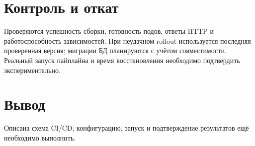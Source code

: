 \documentclass[14pt,a4paper]{extarticle}
\begin{document}
\section{Контроль и откат}
Проверяются успешность сборки, готовность подов, ответы HTTP и работоспособность зависимостей. При неудачном rollout используется последняя проверенная версия; миграции БД планируются с учётом совместимости. Реальный запуск пайплайна и время восстановления необходимо подтвердить экспериментально.
\section{Вывод}
Описана схема CI/CD; конфигурацию, запуск и подтверждение результатов ещё необходимо выполнить.
\end{document}

